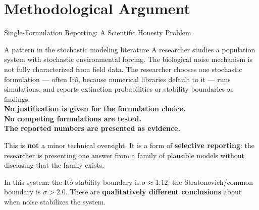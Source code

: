 \documentclass{beamer}
\begin{document}
\section{Methodological Argument}

\begin{frame}{Single-Formulation Reporting: A Scientific Honesty Problem}
  \footnotesize

  \begin{alertblock}{A pattern in the stochastic modeling literature}
    A researcher studies a population system with stochastic environmental
    forcing.  The biological noise mechanism is not fully characterized from
    field data.  The researcher chooses one stochastic formulation ---
    often It\^{o}, because numerical libraries default to it --- runs
    simulations, and reports extinction probabilities or stability boundaries
    as findings.\\[6pt]
    \textbf{No justification is given for the formulation choice.\\
    No competing formulations are tested.\\
    The reported numbers are presented as evidence.}
  \end{alertblock}

  \vspace{0.3cm}
  This is \textbf{not} a minor technical oversight. It is a form of
  \textbf{selective reporting}: the researcher is presenting one answer
  from a family of plausible models without disclosing that the family
  exists.

  \vspace{0.2cm}
  In this system: the It\^{o} stability boundary is $\sigma\approx 1.12$;
  the Stratonovich/common boundary is $\sigma > 2.0$.  These are
  \textbf{qualitatively different conclusions} about when noise stabilizes
  the system.

\end{frame}
\end{document}
